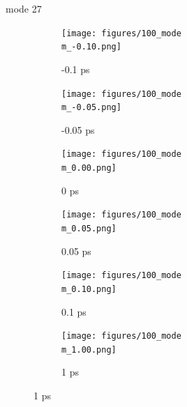 \documentclass{beamer}
\newcommand\w{0.32}
\begin{document}
\renewcommand\m{27}
\begin{frame}{mode \m}
	\begin{figure}
		\centering
		\begin{subfigure}[b]{\w\textwidth}
			\centering
			\texttt{[image: figures/100\_mode\\m\_-0.10.png]}
			\caption{-0.1 ps}
		\end{subfigure}
		\begin{subfigure}[b]{\w\textwidth}
			\centering
			\texttt{[image: figures/100\_mode\\m\_-0.05.png]}
			\caption{-0.05 ps}
		\end{subfigure}
		\begin{subfigure}[b]{\w\textwidth}
			\centering
			\texttt{[image: figures/100\_mode\\m\_0.00.png]}
			\caption{0 ps}
		\end{subfigure}
		\begin{subfigure}[b]{\w\textwidth}
			\centering
			\texttt{[image: figures/100\_mode\\m\_0.05.png]}
			\caption{0.05 ps}
		\end{subfigure}
		\begin{subfigure}[b]{\w\textwidth}
			\centering
			\texttt{[image: figures/100\_mode\\m\_0.10.png]}
			\caption{0.1 ps}
		\end{subfigure}
		\begin{subfigure}[b]{\w\textwidth}
			\centering
			\texttt{[image: figures/100\_mode\\m\_1.00.png]}
			\caption{1 ps}
		\end{subfigure}
	\end{figure}
\end{frame}
\end{document}
